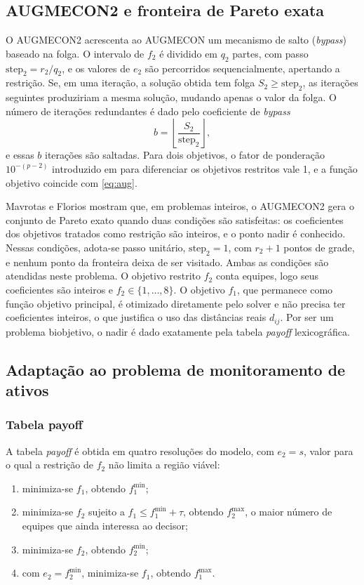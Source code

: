 \documentclass[conference]{IEEEtran}
\begin{document}
\subsection{AUGMECON2 e fronteira de Pareto exata}
\label{sec:augmecon2}

O AUGMECON2 \cite{mavrotas2013} acrescenta ao AUGMECON um mecanismo de salto (\textit{bypass}) baseado na folga. O intervalo de $f_2$ é dividido em $q_2$ partes, com passo $\text{step}_2 = r_2/q_2$, e os valores de $e_2$ são percorridos sequencialmente, apertando a restrição. Se, em uma iteração, a solução obtida tem folga $S_2 \ge \text{step}_2$, as iterações seguintes produziriam a mesma solução, mudando apenas o valor da folga. O número de iterações redundantes é dado pelo coeficiente de \textit{bypass}
\begin{equation}
b = \left\lfloor \frac{S_2}{\text{step}_2} \right\rfloor,
\label{eq:bypass}
\end{equation}
e essas $b$ iterações são saltadas. Para dois objetivos, o fator de ponderação $10^{-(p-2)}$ introduzido em \cite{mavrotas2013} para diferenciar os objetivos restritos vale 1, e a função objetivo coincide com \eqref{eq:aug}.

Mavrotas e Florios \cite{mavrotas2013} mostram que, em problemas inteiros, o AUGMECON2 gera o conjunto de Pareto exato quando duas condições são satisfeitas: os coeficientes dos objetivos tratados como restrição são inteiros, e o ponto nadir é conhecido. Nessas condições, adota-se passo unitário, $\text{step}_2 = 1$, com $r_2 + 1$ pontos de grade, e nenhum ponto da fronteira deixa de ser visitado. Ambas as condições são atendidas neste problema. O objetivo restrito $f_2$ conta equipes, logo seus coeficientes são inteiros e $f_2 \in \{1,\dots,8\}$. O objetivo $f_1$, que permanece como função objetivo principal, é otimizado diretamente pelo solver e não precisa ter coeficientes inteiros, o que justifica o uso das distâncias reais $d_{ij}$. Por ser um problema biobjetivo, o nadir é dado exatamente pela tabela \textit{payoff} lexicográfica.

\subsection{Adaptação ao problema de monitoramento de ativos}

\subsubsection{Tabela payoff}
A tabela \textit{payoff} é obtida em quatro resoluções do modelo, com $e_2 = s$, valor para o qual a restrição de $f_2$ não limita a região viável:
\begin{enumerate}
  \item minimiza-se $f_1$, obtendo $f_1^{\min}$;
  \item minimiza-se $f_2$ sujeito a $f_1 \le f_1^{\min} + \tau$, obtendo $f_2^{\max}$, o maior número de equipes que ainda interessa ao decisor;
  \item minimiza-se $f_2$, obtendo $f_2^{\min}$;
  \item com $e_2 = f_2^{\min}$, minimiza-se $f_1$, obtendo $f_1^{\max}$.
\end{enumerate}
\end{document}
